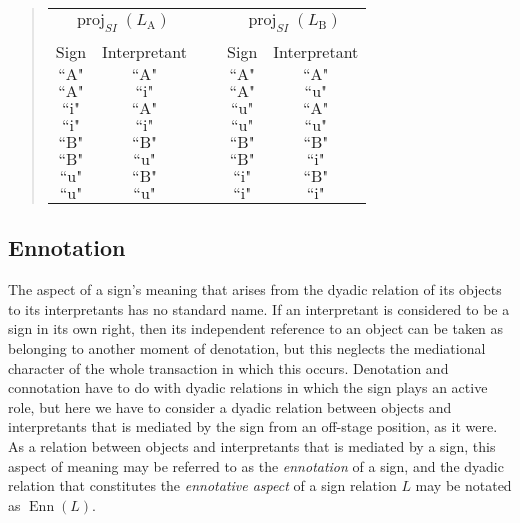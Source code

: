 \documentclass[12pt]{article}
\begin{document}
\begin{quote}\begin{tabular}{|c|c|p{2cm}|c|c|}
\multicolumn{2}{c}{$\operatorname{proj}_{SI}(L_{\mathrm{A}})$} &
\multicolumn{1}{c}{~} &
\multicolumn{2}{c}{$\operatorname{proj}_{SI}(L_{\mathrm{B}})$} \\
\cline{1-2}\cline{4-5}
Sign & Interpretant & & Sign & Interpretant \\
\cline{1-2}\cline{4-5}
$\text{``A"}$ & $\text{``A"}$ &&
$\text{``A"}$ & $\text{``A"}$ \\
\cline{1-2}\cline{4-5}
$\text{``A"}$ & $\text{``i"}$ &&
$\text{``A"}$ & $\text{``u"}$ \\
\cline{1-2}\cline{4-5}
$\text{``i"}$ & $\text{``A"}$ &&
$\text{``u"}$ & $\text{``A"}$ \\
\cline{1-2}\cline{4-5}
$\text{``i"}$ & $\text{``i"}$ &&
$\text{``u"}$ & $\text{``u"}$ \\
\cline{1-2}\cline{4-5}
$\text{``B"}$ & $\text{``B"}$ &&
$\text{``B"}$ & $\text{``B"}$ \\
\cline{1-2}\cline{4-5}
$\text{``B"}$ & $\text{``u"}$ &&
$\text{``B"}$ & $\text{``i"}$ \\
\cline{1-2}\cline{4-5}
$\text{``u"}$ & $\text{``B"}$ &&
$\text{``i"}$ & $\text{``B"}$ \\
\cline{1-2}\cline{4-5}
$\text{``u"}$ & $\text{``u"}$ &&
$\text{``i"}$ & $\text{``i"}$ \\
\cline{1-2}\cline{4-5}
\end{tabular}\end{quote}

\subsection{Ennotation}

The aspect of a sign's meaning that arises from the dyadic relation of its objects to its interpretants has no standard name.  If an interpretant is considered to be a sign in its own right, then its independent reference to an object can be taken as belonging to another moment of denotation, but this neglects the mediational character of the whole transaction in which this occurs.  Denotation and connotation have to do with dyadic relations in which the sign plays an active role, but here we have to consider a dyadic relation between objects and interpretants that is mediated by the sign from an off-stage position, as it were.  As a relation between objects and interpretants that is mediated by a sign, this aspect of meaning may be referred to as the \textit{ennotation} of a sign, and the dyadic relation that constitutes the \textit{ennotative aspect} of a sign relation $L$ may be notated as $\operatorname{Enn}(L)$.
\end{document}
